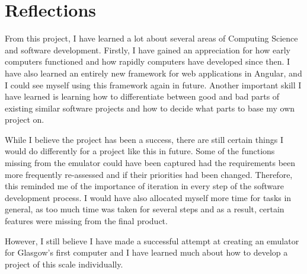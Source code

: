 \documentclass{l4proj}
\begin{document}
\section{Reflections}
From this project, I have learned a lot about several areas of Computing Science and software development. Firstly, I have gained an appreciation for how early computers functioned and how rapidly computers have developed since then. I have also learned an entirely new framework for web applications in Angular, and I could see myself using this framework again in future. Another important skill I have learned is learning how to differentiate between good and bad parts of existing similar software projects and how to decide what parts to base my own project on.

While I believe the project has been a success, there are still certain things I would do differently for a project like this in future. Some of the functions missing from the emulator could have been captured had the requirements been more frequently re-assessed and if their priorities had been changed. Therefore, this reminded me of the importance of iteration in every step of the software development process. I would have also allocated myself more time for tasks in general, as too much time was taken for several steps and as a result, certain features were missing from the final product.

However, I still believe I have made a successful attempt at creating an emulator for Glasgow's first computer and I have learned much about how to develop a project of this scale individually. 


%
% 
\end{document}
